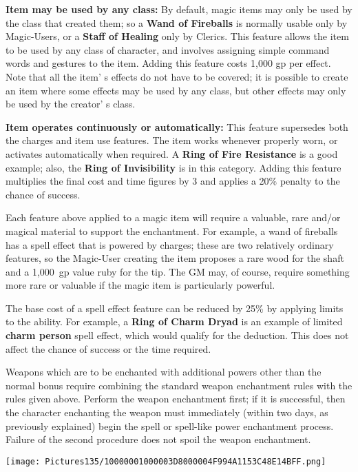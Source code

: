 \documentclass[a4paper,twoside,openany,10pt]{book}
\begin{document}
\begin{multicols}{2}
\textbf{Item may be used by any class:} By default, magic items may only be used by the class that created them; so a \textbf{Wand of Fireballs} is normally usable only by Magic-Users, or a \textbf{Staff of Healing} only by Clerics. This feature allows the item to be used by any class of character, and involves assigning simple command words and gestures to the item. Adding this feature costs 1,000 gp per effect. Note that all the item' s effects do not have to be covered; it is possible to create an item where some effects may be used by any class, but other effects may only be used by the creator' s class.


\textbf{Item operates continuously or automatically:} This feature supersedes both the charges and item use features. The item works whenever properly worn, or activates automatically when required. A \textbf{Ring of Fire Resistance} is a good example; also, the \textbf{Ring of Invisibility} is in this category. Adding this feature multiplies the final cost and time figures by 3 and applies a 20\% penalty to the chance of success. 

Each feature above applied to a magic item will require a valuable, rare and/or magical material to support the enchantment. For example, a wand of fireballs has a spell effect that is powered by charges; these are two relatively ordinary features, so the Magic-User creating the item proposes a rare wood for the shaft and a 1,000~gp value ruby for the tip. The GM may, of course, require something more rare or valuable if the magic item is particularly powerful.

The base cost of a spell effect feature can be reduced by 25\% by applying limits to the ability. For example, a \textbf{Ring of Charm Dryad} is an example of limited \textbf{charm person} spell effect, which would qualify for the deduction. This does not affect the chance of success or the time required.

Weapons which are to be enchanted with additional powers other than the normal bonus require combining the standard weapon enchantment rules with the rules given above. Perform the weapon enchantment first; if it is successful, then the character enchanting the weapon must immediately (within two days, as previously explained) begin the spell or spell-like power enchantment process. Failure of the second procedure does not spoil the weapon enchantment.


\begin{center}
	\texttt{[image: Pictures135/10000001000003D8000004F994A1153C48E14BFF.png]}
\end{center}


\end{multicols}
\end{document}
